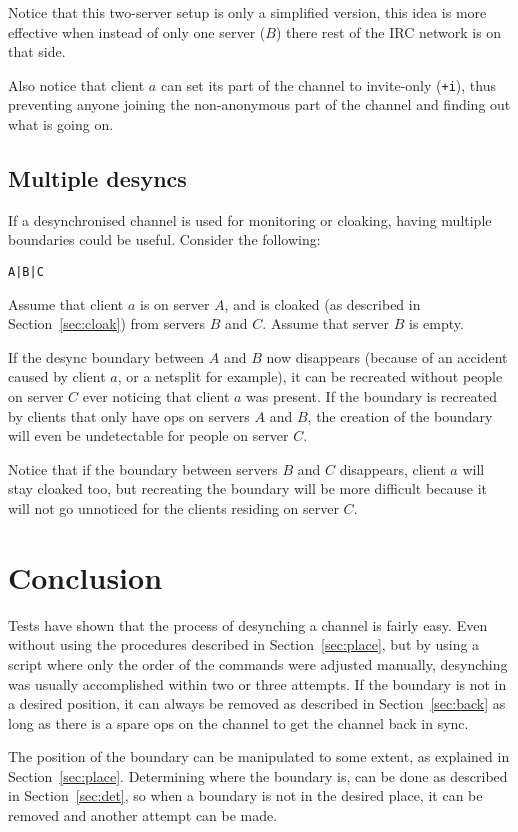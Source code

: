 \documentclass{article}
\theoremstyle{definition}
\begin{document}
\noindent
Notice that this two-server setup is only a simplified version, this idea is
more effective when instead of only one server ($B$) there rest of the IRC
network is on that side.

Also notice that client $a$ can set its part of the channel to invite-only
(\verb#+i#), thus preventing anyone joining the non-anonymous part of the
channel and finding out what is going on.

\subsection{Multiple desyncs} \label{sec:multi}
If a desynchronised channel is used for monitoring or cloaking, having multiple
boundaries could be useful. Consider the following:
\begin{center}
\verb#A|B|C#
\end{center}
Assume that client $a$ is on server $A$, and is cloaked (as described in
Section~\ref{sec:cloak}) from servers $B$ and $C$. Assume that server $B$ is
empty.

If the desync boundary between $A$ and $B$ now disappears (because of an
accident caused by client $a$, or a netsplit for example), it can be recreated
without people on server $C$ ever noticing that client $a$ was present. If the
boundary is recreated by clients that only have ops on servers $A$ and $B$, the
creation of the boundary will even be undetectable for people on server $C$.

Notice that if the boundary between servers $B$ and $C$ disappears, client $a$
will stay cloaked too, but recreating the boundary will be more difficult
because it will not go unnoticed for the clients residing on server $C$.

\section{Conclusion} \label{sec:con}
Tests have shown that the process of desynching a channel is fairly easy. Even
without using the procedures described in Section~\ref{sec:place}, but by using
a script where only the order of the commands were adjusted manually,
desynching was usually accomplished within two or three attempts. If the
boundary is not in a desired position, it can always be removed as described in
Section~\ref{sec:back} as long as there is a spare ops on the channel to get
the channel back in sync.

The position of the boundary can be manipulated to some extent, as explained in
Section~\ref{sec:place}. Determining where the boundary is, can be done as
described in Section~\ref{sec:det}, so when a boundary is not in the desired
place, it can be removed and another attempt can be made.
\end{document}
